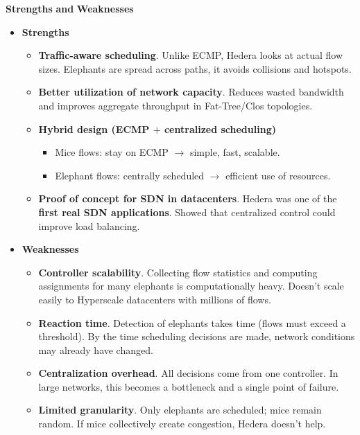 \highspace
\begin{flushleft}
    \textcolor{Green3}{ \textbf{Strengths}} \textbf{and} \textcolor{Red2}{ \textbf{Weaknesses}}
\end{flushleft}
\begin{itemize}
    \item[\textcolor{Green3}{\faIcon{check-circle}}] \textcolor{Green3}{\textbf{Strengths}}
    \begin{itemize}
        \item[\textcolor{Green3}{\faIcon{check}}] \textcolor{Green3}{\textbf{Traffic-aware scheduling}}. Unlike ECMP, Hedera looks at actual flow sizes. Elephants are spread across paths, it avoids collisions and hotspots.
        \item[\textcolor{Green3}{\faIcon{check}}] \textcolor{Green3}{\textbf{Better utilization of network capacity}}. Reduces wasted bandwidth and improves aggregate throughput in Fat-Tree/Clos topologies.
        \item[\textcolor{Green3}{\faIcon{check}}] \textcolor{Green3}{\textbf{Hybrid design (ECMP $+$ centralized scheduling)}}
        \begin{itemize}
            \item Mice flows: stay on ECMP $\rightarrow$ simple, fast, scalable.
            \item Elephant flows: centrally scheduled $\rightarrow$ efficient use of resources.
        \end{itemize}
        \item[\textcolor{Green3}{\faIcon{check}}] \textcolor{Green3}{\textbf{Proof of concept for SDN in datacenters}}. Hedera was one of the \textbf{first real SDN applications}. Showed that centralized control could improve load balancing.
    \end{itemize}
    \item[\textcolor{Red2}{\faIcon{times-circle}}] \textcolor{Red2}{\textbf{Weaknesses}}
    \begin{itemize}
        \item[\textcolor{Red2}{\faIcon{times}}] \textcolor{Red2}{\textbf{Controller scalability}}. Collecting flow statistics and computing assignments for many elephants is computationally heavy. Doesn't scale easily to Hyperscale datacenters with millions of flows.
        \item[\textcolor{Red2}{\faIcon{times}}] \textcolor{Red2}{\textbf{Reaction time}}. Detection of elephants takes time (flows must exceed a threshold). By the time scheduling decisions are made, network conditions may already have changed.
        \item[\textcolor{Red2}{\faIcon{times}}] \textcolor{Red2}{\textbf{Centralization overhead}}. All decisions come from one controller. In large networks, this becomes a bottleneck and a single point of failure.
        \item[\textcolor{Red2}{\faIcon{times}}] \textcolor{Red2}{\textbf{Limited granularity}}. Only elephants are scheduled; mice remain random. If mice collectively create congestion, Hedera doesn't help.
    \end{itemize}
\end{itemize}
